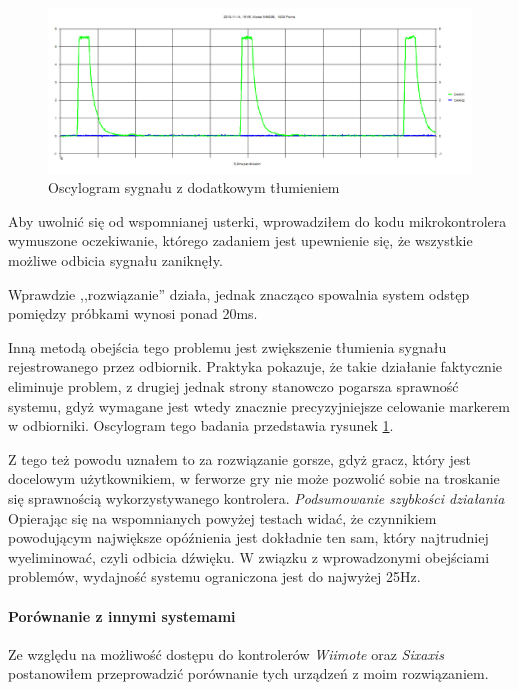 \begin{figure}
 \includegraphics[width=\textwidth]{gfx/oscyloskop_attenuated.png}
 \caption{Oscylogram sygnału z dodatkowym tłumieniem}
 \label{fig:oscilloscope_attenuated}
\end{figure}


Aby uwolnić się od wspomnianej usterki, wprowadziłem do kodu mikrokontrolera wymuszone oczekiwanie, którego zadaniem jest upewnienie się, że wszystkie możliwe odbicia sygnału zaniknęły.

Wprawdzie ,,rozwiązanie'' działa, jednak znacząco spowalnia system \ppauza odstęp pomiędzy próbkami wynosi ponad 20ms.

Inną metodą obejścia tego problemu jest zwiększenie tłumienia sygnału rejestrowanego przez odbiornik. Praktyka pokazuje, że takie działanie faktycznie eliminuje problem, z drugiej jednak strony stanowczo pogarsza sprawność systemu, gdyż wymagane jest wtedy znacznie precyzyjniejsze celowanie markerem w odbiorniki. Oscylogram tego badania przedstawia rysunek \ref{fig:oscilloscope_attenuated}.

Z tego też powodu uznałem to za rozwiązanie gorsze, gdyż gracz, który jest docelowym użytkownikiem, w ferworze gry nie może pozwolić sobie na troskanie się sprawnością wykorzystywanego kontrolera.
\newline
\newline
\textsl{Podsumowanie szybkości działania}
Opierając się na wspomnianych powyżej testach widać, że czynnikiem powodującym największe opóźnienia jest dokładnie ten sam, który najtrudniej wyeliminować, czyli odbicia dźwięku. W związku z wprowadzonymi obejściami problemów, wydajność systemu ograniczona jest do najwyżej 25Hz.

\paragraph{Porównanie z innymi systemami}
Ze względu na możliwość dostępu do kontrolerów \textsl{Wiimote} oraz \textsl{Sixaxis} postanowiłem przeprowadzić porównanie tych urządzeń z moim rozwiązaniem.
\newline

